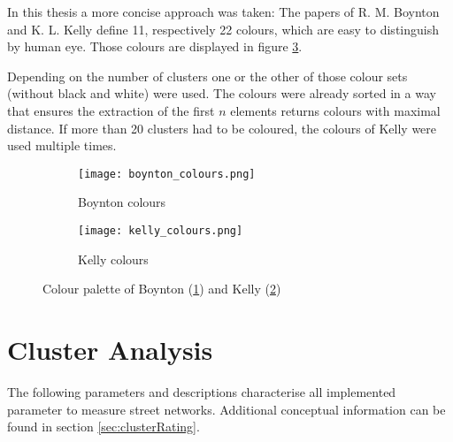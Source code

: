 In this thesis a more concise approach was taken: The papers of R. M. Boynton \cite{boynton:1989} and K. L. Kelly \cite{kelly:1965} define 11, respectively 22 colours, which are easy to distinguish by human eye. Those colours are displayed in figure \ref{fig:colours}.

Depending on the number of clusters one or the other of those colour sets (without black and white) were used. The colours were already sorted in a way that ensures the extraction of the first $n$ elements returns colours with maximal distance. If more than 20 clusters had to be coloured, the colours of Kelly were used multiple times.

\begin{figure}
    \centering
    \begin{subfigure}[b]{\textwidth}
        \begin{mdframed}[style=mdthight]
            \texttt{[image: boynton\_colours.png]}
        \end{mdframed}
        \caption{Boynton colours}
        \label{fig:boynton_colours}
    \end{subfigure}
    \par\medskip
    \begin{subfigure}[b]{\textwidth}
        \begin{mdframed}[style=mdthight]
            \texttt{[image: kelly\_colours.png]}
        \end{mdframed}
        \caption{Kelly colours}
        \label{fig:kelly_colurs}
    \end{subfigure}
    \caption{Colour palette of Boynton (\ref{fig:boynton_colours}) and Kelly (\ref{fig:kelly_colurs})}
    \label{fig:colours}
\end{figure}

\FloatBarrier
\pagebreak
\section{Cluster Analysis}
\label{sec:cluster_analysis_impl}
The following parameters and descriptions characterise all implemented parameter to measure street networks. Additional conceptual information can be found in section \ref{sec:clusterRating}.

